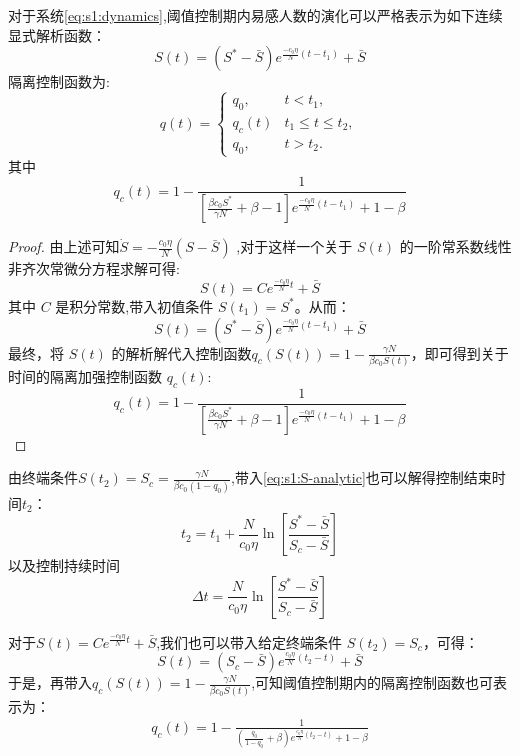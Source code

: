 \documentclass[lang=cn,a4paper,newtx]{elegantpaper}
\numberwithin{equation}{section}
\theoremstyle{plain}
\begin{document}
\begin{theorem}
    对于系统\eqref{eq:s1:dynamics},阈值控制期内易感人数的演化可以严格表示为如下连续显式解析函数：
    \begin{equation}
        S(t) = \left( S^* - \bar S \right) e^{\frac{-c_0\eta}{N}(t - t_1 )} + \bar S
        \label{eq:s1:S-analytic}
    \end{equation}
    隔离控制函数为:
    \begin{equation*}
    q(t) =
    \begin{cases}
    q_0, & t < t_1, \\
    q_c(t) & t_1 \le t \le t_2, \\
    q_0, & t > t_2.       
    \end{cases}
    \end{equation*}
    其中
    \begin{equation}
        q_c(t)= 1 - \frac{1}{\left[\frac{\beta c_0 S^* }{\gamma N} + \beta- 1 \right] e^{\frac{-c_0 \eta}{N} (t-t_1)} + 1-\beta} 
    \end{equation}
\end{theorem}
\begin{proof}
    由上述可知$\dot{S}=-\frac{c_0\eta}{N}(S-\bar S)$ ,对于这样一个关于 $S(t)$ 的一阶常系数线性非齐次常微分方程求解可得:
    \[
        S(t) = C e^{\frac{-c_0 \eta}{N} t} + \bar S
    \]
    其中 $C$ 是积分常数,带入初值条件 $S(t_1) = S^*$。从而：
    \[
    S(t) = \left( S^* - \bar S \right) e^{\frac{-c_0\eta}{N}(t - t_1 )} + \bar S
    \]
    最终，将 $S(t)$ 的解析解代入控制函数$q_c(S(t))=1-\frac{\gamma N}{\beta c_0 S(t)}$，即可得到关于时间的隔离加强控制函数 $q_c(t)$:
    \[
    q_c(t)= 1 - \frac{1}{\left[\frac{\beta c_0 S^* }{\gamma N} + \beta- 1 \right] e^{\frac{-c_0 \eta}{N} (t-t_1)} + 1-\beta}
    \]
\end{proof}
\begin{remark}
    由终端条件$S(t_2) = S_c = \frac{\gamma N}{\beta c_0(1-q_0)}$,带入\eqref{eq:s1:S-analytic}也可以解得控制结束时间$t_2$：
    \begin{equation*}
     t_2= t_1+\frac{N}{c_0 \eta}
     \ln \left[
     \frac{S^*-\bar S}
     {S_c-\bar S}
     \right]
    \end{equation*}
    以及控制持续时间
    \begin{equation*}
    \Delta t = \frac{N}{c_0 \eta}
     \ln \left[
     \frac{S^*-\bar S}
     {S_c-\bar S}
     \right]
    \end{equation*}
\end{remark}
\begin{remark}
    对于$S(t) = C e^{\frac{-c_0 \eta}{N} t} + \bar S$,我们也可以带入给定终端条件 $S(t_2) = S_c$，可得：
    \begin{equation*}
    S(t) = \left( S_c - \bar S \right) e^{\frac{c_0\eta}{N}(t_2 - t )} + \bar S
    \end{equation*}
    于是，再带入$q_c(S(t))=1-\frac{\gamma N}{\beta c_0 S(t)}$,可知阈值控制期内的隔离控制函数也可表示为：
    \begin{align*}
    q_c(t)=1 - \frac{1}{(\tfrac{q_0}{1-q_0}+\beta)e^{\frac{c_0\eta}{N}(t_2 - t )}+1-\beta}
    \end{align*}
\end{remark}
\end{document}
